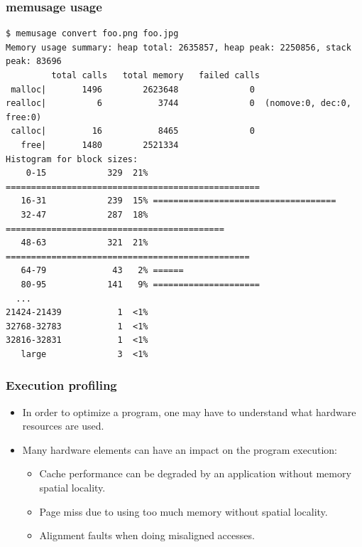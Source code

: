 \begin{frame}[fragile]
  \frametitle{memusage usage}
  \begin{block}{}
    \begin{verbatim}
$ memusage convert foo.png foo.jpg
Memory usage summary: heap total: 2635857, heap peak: 2250856, stack peak: 83696
         total calls   total memory   failed calls
 malloc|       1496        2623648              0
realloc|          6           3744              0  (nomove:0, dec:0, free:0)
 calloc|         16           8465              0
   free|       1480        2521334
Histogram for block sizes:
    0-15            329  21% ==================================================
   16-31            239  15% ====================================
   32-47            287  18% ===========================================
   48-63            321  21% ================================================
   64-79             43   2% ======
   80-95            141   9% =====================
  ...
21424-21439           1  <1% 
32768-32783           1  <1% 
32816-32831           1  <1% 
   large              3  <1% 
    \end{verbatim}
  \end{block}
\end{frame}

\begin{frame}
  \frametitle{Execution profiling}
  \begin{itemize}
    \item In order to optimize a program, one may have to understand what
          hardware resources are used.
    \item Many hardware elements can have an impact on the program execution:
    \begin{itemize}
      \item Cache performance can be degraded by an application without memory
            spatial locality.
      \item Page miss due to using too much memory without spatial locality.
      \item Alignment faults when doing misaligned accesses.
    \end{itemize}
  \end{itemize}
\end{frame}

